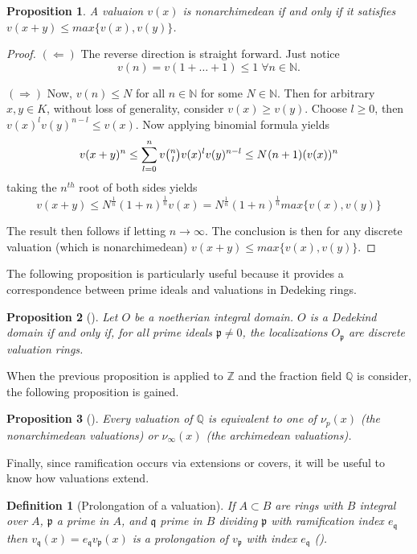\documentclass[paper=a4, fontsize=11pt]{scrartcl} %
\numberwithin{equation}{section} %
\numberwithin{figure}{section} %
\numberwithin{table}{section} %
\theoremstyle{break}
\newtheorem{defn}{Definition}
\newtheorem{prop}{Proposition}
\begin{document}
\begin{prop}
 A valuaion $v(x)$ is nonarchimedean if and only if it satisfies $v(x+y) \leq max\{v(x),v(y)\}$.
\end{prop}
\begin{proof}
$(\Leftarrow)$ The reverse direction is straight forward. Just notice 
$$v(n)=v(1+\ldots+1) \leq 1\; \forall n\in\mathbb{N}.$$

$(\Rightarrow)$ Now, $v(n) \leq N$ for all $n\in\mathbb{N}$ for some $N \in \mathbb{N}$. Then for arbitrary $x,y\in K$, without loss of generality, consider $v(x) \geq v(y)$. Choose $l \geq 0$, then $v(x)^{l}v(y)^{n-l} \leq v(x)$. Now applying binomial formula yields
$$
	v(x+y)^{n} \leq \sum_{l=0}^{n} v\tbinom{n}{l} v(x)^l v(y)^{n-l} \leq N^{}(n+1)(v(x))^n
$$
taking the $n^{th}$ root of both sides yields
$$
v(x+y) \leq N^{\frac{1}{n}}(1+n)^{\frac{1}{n}} v(x) = N^{\frac{1}{n}}(1+n)^{\frac{1}{n}} max\{v(x), v(y) \}
$$

The result then follows if letting $n \to \infty$. The conclusion is then for any discrete valuation (which is nonarchimedean) $v(x+y) \leq max \{v(x),v(y) \}$.
\end{proof}

The following proposition is particularly useful because it provides a correspondence between prime ideals and valuations in Dedeking rings.
\begin{prop}[\cite{Neukirch}]
Let $O$ be a noetherian integral domain. $O$ is a Dedekind domain if and only if, for all prime ideals $\mathfrak{p} \not= 0$, the localizations $O_\mathfrak{p}$ are discrete valuation rings.
\end{prop}
When the previous proposition is applied to $\mathbb{Z}$ and the fraction field $\mathbb{Q}$ is consider, the following proposition is gained.
\begin{prop}[\cite{Neukirch}]
Every valuation of $\mathbb{Q}$ is equivalent to one of $\nu_p(x)$ (the nonarchimedean valuations) or $\nu_\infty(x)$ (the archimedean valuations).
\end{prop}
Finally, since ramification occurs via extensions or covers, it will be useful to know how valuations extend.
\begin{defn}[Prolongation of a valuation]
If $A \subset B$ are rings with $B$ integral over $A$, $\mathfrak{p}$ a prime in $A$, and $\mathfrak{q}$ prime in $B$ dividing $\mathfrak{p}$ with ramification index $e_\mathfrak{q}$ then $v_\mathfrak{q}(x)=e_\mathfrak{q}v_\mathfrak{p}(x)$ is a prolongation of $v_\mathfrak{p}$ with index $e_\mathfrak{q}$ (\cite{Serre}).
\end{defn}
\end{document}
